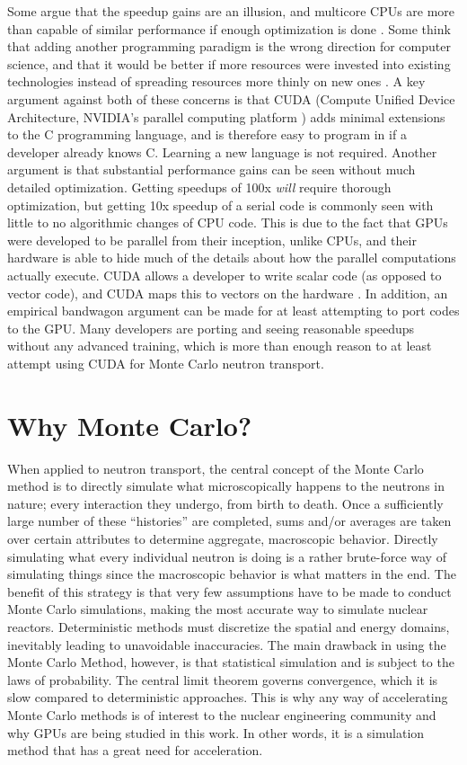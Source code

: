 Some argue that the speedup gains are an illusion, and multicore CPUs are more than capable of similar performance if enough optimization is done \cite{debunk}. Some think that adding another programming paradigm is the wrong direction for computer science, and that it would be better if more resources were invested into existing technologies instead of spreading resources more thinly on new ones \cite{}.  A key argument against both of these concerns is that CUDA (Compute Unified Device Architecture, NVIDIA's parallel computing platform \cite{cuda}) adds minimal extensions to the C programming language, and is therefore easy to program in if a developer already knows C.  Learning a new language is not required.  Another argument is that substantial performance gains can be seen without much detailed optimization.  Getting speedups of 100x \emph{will} require thorough optimization, but getting 10x speedup of a serial code is commonly seen with little to no algorithmic changes of CPU code.  This is due to the fact that GPUs were developed to be parallel from their inception, unlike CPUs, and their hardware is able to hide much of the details about how the parallel computations actually execute.  CUDA allows a developer to write scalar code (as opposed to vector code), and CUDA maps this to vectors on the hardware \cite{cuda}.  In addition, an empirical  bandwagon argument can be made for at least attempting to port codes to the GPU.  Many developers are porting and seeing reasonable speedups without any advanced training, which is more than enough reason to at least attempt using CUDA for Monte Carlo neutron transport. 

\section{Why Monte Carlo?}

When applied to neutron transport, the central concept of the Monte Carlo method is to directly simulate what  microscopically happens to the neutrons in nature; every interaction they undergo, from birth to death.  Once a sufficiently large number of these ``histories'' are completed, sums and/or averages are taken over certain attributes to determine aggregate, macroscopic behavior.  Directly simulating what every individual neutron is doing is a rather brute-force way of simulating things since the macroscopic behavior is what matters in the end.   The benefit of this strategy is that very few assumptions have to be made to conduct Monte Carlo simulations, making the most accurate way to simulate nuclear reactors.  Deterministic methods must discretize the spatial and energy domains, inevitably leading to unavoidable inaccuracies.  The main drawback in using the Monte Carlo Method, however, is that statistical simulation and is subject to the laws of probability.  The central limit theorem governs convergence, which it is slow compared to deterministic approaches.  This is why any way of accelerating Monte Carlo methods is of interest to the nuclear engineering community and why GPUs are being studied in this work.  In other words, it is a simulation method that has a great need for acceleration. 

